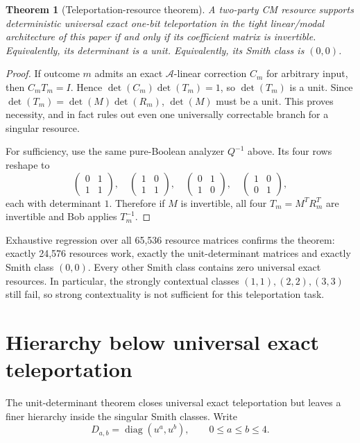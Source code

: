 \documentclass[11pt]{article}
\newtheorem{theorem}{Theorem}
\newcommand{\A}{\mathcal A}
\begin{document}
\begin{theorem}[Teleportation-resource theorem]
A two-party CM resource supports deterministic universal exact one-bit
teleportation in the tight linear/modal architecture of this paper if and
only if its coefficient matrix is invertible.  Equivalently, its determinant
is a unit.  Equivalently, its Smith class is $(0,0)$.
\end{theorem}

\begin{proof}
If outcome $m$ admits an exact $\A$-linear correction $C_m$ for arbitrary
input, then $C_mT_m=I$.  Hence
$\det(C_m)\det(T_m)=1$, so $\det(T_m)$ is a unit.  Since
$\det(T_m)=\det(M)\det(R_m)$, $\det(M)$ must be a unit.  This proves
necessity, and in fact rules out even one universally correctable branch for
a singular resource.

For sufficiency, use the same pure-Boolean analyzer $Q^{-1}$ above.  Its four
rows reshape to
\[
\begin{pmatrix}0&1\\1&1\end{pmatrix},\quad
\begin{pmatrix}1&0\\1&1\end{pmatrix},\quad
\begin{pmatrix}0&1\\1&0\end{pmatrix},\quad
\begin{pmatrix}1&0\\0&1\end{pmatrix},
\]
each with determinant $1$.  Therefore if $M$ is invertible, all four
$T_m=M^TR_m^T$ are invertible and Bob applies $T_m^{-1}$.
\end{proof}

Exhaustive regression over all 65,536 resource matrices confirms the theorem:
exactly 24,576 resources work, exactly the unit-determinant matrices and
exactly Smith class $(0,0)$.  Every other Smith class contains zero universal
exact resources.  In particular, the strongly contextual classes
$(1,1),(2,2),(3,3)$ still fail, so strong contextuality is not sufficient for
this teleportation task.

\section{Hierarchy below universal exact teleportation}

The unit-determinant theorem closes universal exact teleportation but leaves a
finer hierarchy inside the singular Smith classes.  Write
\[
D_{a,b}=\operatorname{diag}(u^a,u^b),\qquad 0\le a\le b\le 4.
\]
\end{document}
